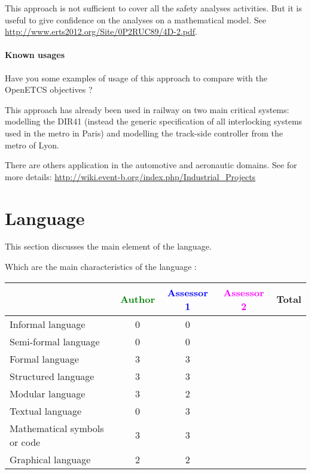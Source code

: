 \begin{author_comment}
This approach is not sufficient to cover all the safety analyses activities. But it is useful to give confidence on the analyses on a mathematical model. See \url{http://www.erts2012.org/Site/0P2RUC89/4D-2.pdf}.
\end{author_comment}


\paragraph{Known usages} Have you some examples of usage of this approach to  compare with the OpenETCS objectives ?


\begin{author_comment}
This approach has already been used in railway on two  main critical systems: modelling the DIR41 (instead the generic specification of all interlocking systems used in the metro in Paris)  and modelling the track-side controller from the metro of Lyon. 

There are others application in the automotive and aeronautic domains. See for more details: \url{http://wiki.event-b.org/index.php/Industrial_Projects}
\end{author_comment}


\section{Language}
This section discusses the main element of the language.

Which are the main characteristics of the language :

\begin{tabular}{|l | c | c | c | c|}
\hline
& \textcolor{green}{Author} & \textcolor{blue}{Assessor 1} & \textcolor{magenta}{Assessor 2} & Total \\
\hline 
Informal language & 0 & 0 & &  \\
\hline 
Semi-formal language & 0 & 0 & &  \\
\hline
Formal language & 3 & 3 & &  \\
\hline
Structured language & 3 & 3 & & \\
\hline
Modular language & 3 & 2 & & \\
\hline
Textual language & 0 & 3 & & \\
\hline
Mathematical symbols or code & 3 & 3 & & \\
\hline
Graphical language & 2 & 2 & & \\
\hline
\end{tabular}

